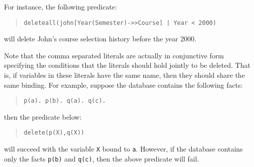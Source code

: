 \documentclass[11pt]{article}
\begin{document}
For instance, the following predicate:
\begin{quote}
\begin{verbatim}
deleteall(john[Year(Semester)->>Course] | Year < 2000)
\end{verbatim}
\end{quote}
will delete {\sf John}'s course selection history before the year
2000.

Note that the comma separated literals are actually in conjunctive
form specifying the conditions that the literals should hold jointly
to be deleted. That is, if variables in these literals have the same
name, then they should share the same binding. For example, suppose
the database contains the following facts:
\begin{quote}
\begin{verbatim}
p(a). p(b). q(a). q(c).
\end{verbatim}
\end{quote}
then the predicate below:
\begin{quote}
\begin{verbatim}
delete(p(X),q(X))
\end{verbatim}
\end{quote}
will succeed with the variable {\tt X} bound to {\tt a}.  However, if
the database contains only the facts {\tt p(b)} and {\tt q(c)}, then
the above predicate will fail.
\end{document}
